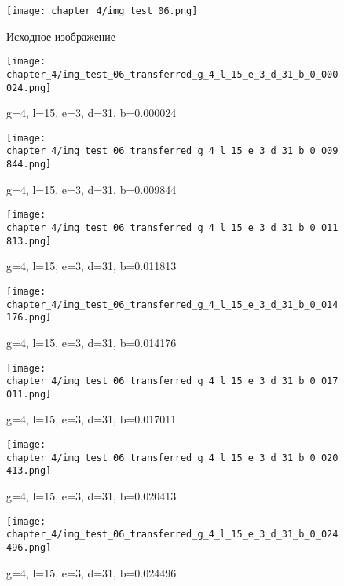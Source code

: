 \begin{figure}[h]
\begin{center}
\begin{minipage}[h]{0.4\linewidth}
\texttt{[image: chapter\_4/img\_test\_06.png]}
\caption{Исходное изображение} %
\label{img:experimoriginal} %
\end{minipage}
\hfill 
\begin{minipage}[h]{0.4\linewidth}
\texttt{[image: chapter\_4/img\_test\_06\_transferred\_g\_4\_l\_15\_e\_3\_d\_31\_b\_0\_000024.png]}
\caption{g=4, l=15, e=3, d=31, b=0.000024}
\label{img:experimcoded2}
\end{minipage}
\end{center}

\begin{center}
\begin{minipage}[h]{0.4\linewidth}
\texttt{[image: chapter\_4/img\_test\_06\_transferred\_g\_4\_l\_15\_e\_3\_d\_31\_b\_0\_009844.png]}
\caption{g=4, l=15, e=3, d=31, b=0.009844}
\label{img:experimcoded3}
\end{minipage}
\hfill 
\begin{minipage}[h]{0.4\linewidth}
\texttt{[image: chapter\_4/img\_test\_06\_transferred\_g\_4\_l\_15\_e\_3\_d\_31\_b\_0\_011813.png]}
\caption{g=4, l=15, e=3, d=31, b=0.011813}
\label{img:experimcoded4}
\end{minipage}
\end{center}
\end{figure}

\begin{figure}[h]
\begin{center}
\begin{minipage}[h]{0.4\linewidth}
\texttt{[image: chapter\_4/img\_test\_06\_transferred\_g\_4\_l\_15\_e\_3\_d\_31\_b\_0\_014176.png]}
\caption{g=4, l=15, e=3, d=31, b=0.014176}
\label{img:experimcoded5}
\end{minipage}
\hfill 
\begin{minipage}[h]{0.4\linewidth}
\texttt{[image: chapter\_4/img\_test\_06\_transferred\_g\_4\_l\_15\_e\_3\_d\_31\_b\_0\_017011.png]}
\caption{g=4, l=15, e=3, d=31, b=0.017011}
\label{img:experimcoded6}
\end{minipage}
\end{center}

\begin{center}
\begin{minipage}[h]{0.4\linewidth}
\texttt{[image: chapter\_4/img\_test\_06\_transferred\_g\_4\_l\_15\_e\_3\_d\_31\_b\_0\_020413.png]}
\caption{g=4, l=15, e=3, d=31, b=0.020413}
\label{img:experimcoded7}
\end{minipage}
\hfill 
\begin{minipage}[h]{0.4\linewidth}
\texttt{[image: chapter\_4/img\_test\_06\_transferred\_g\_4\_l\_15\_e\_3\_d\_31\_b\_0\_024496.png]}
\caption{g=4, l=15, e=3, d=31, b=0.024496}
\label{img:experimcoded8}
\end{minipage}
\end{center}
\end{figure}

